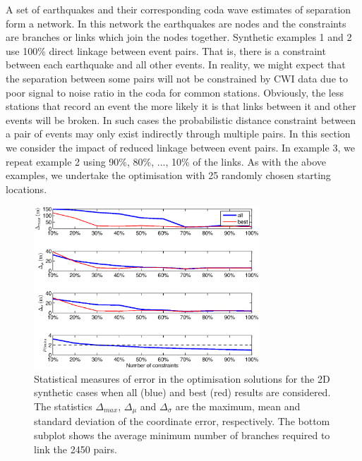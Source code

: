 \documentclass[extra]{gji}
\begin{document}
A set of earthquakes and their corresponding coda wave estimates of
separation form a network. In this network the earthquakes are nodes
and the constraints are branches or links which join the nodes
together. Synthetic examples 1 and 2 use 100\% direct linkage
between event pairs. That is, there is a constraint between each
earthquake and all other events. In reality, we might expect that
the separation between some pairs will not be constrained by CWI
data due to poor signal to noise ratio in the coda for common
stations. Obviously, the less stations that record an event the more
likely it is that links between it and other events will be broken.
In such cases the probabilistic distance constraint between a pair
of events may only exist indirectly through multiple pairs. In this
section we consider the impact of reduced linkage between event
pairs. In example 3, we repeat example 2 using 90\%, 80\%, ..., 10\%
of the links. As with the above examples, we undertake the
optimisation with 25 randomly chosen starting locations.

\begin{figure}
\noindent\includegraphics[width = 20pc]{diags/ressummary_2Dsynth50eq.eps}
\caption{Statistical measures of error in the optimisation solutions for the 2D synthetic cases when all (blue)
and best (red) results are considered. The statistics $\Delta_{max}$, $\Delta_\mu$ and
$\Delta_\sigma$ are the maximum, mean and standard deviation of the coordinate error, respectively.
The bottom subplot shows the average minimum number of branches required to link the 2450 pairs.}
 \label{fig:optimisationresults-2Dsynth}
\end{figure}
\end{document}
